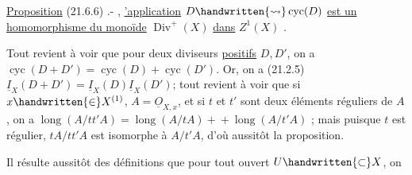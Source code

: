 \uline{Proposition} (21.6.6) .- , \uline{'application} $D\handwritten{\leadsto}\operatorname{cyc}(D)$\deleted{\unsure{;}} \uline{est un homomorphisme du monoïde} $\operatorname{Div}^{+}(X)$ \uline{dans} $Z^{1}(X)$ .

Tout revient à voir que pour deux diviseurs \uline{positifs} $D,D'$, on a $\operatorname{cyc}(D+D')=\operatorname{cyc}(D)+\operatorname{cyc}(D')$. Or, on a (21.2.5) $\underline I_{X}(D+D')=\underline I_{X}(D)\underline I_{X}(D')$; tout revient à voir que si $x\handwritten{\in}X^{(1)}$,  $A=\underline O_{X,x}$, et si $t$ et $t'$ sont deux éléments réguliers de $A$, on a $\operatorname{long}(A/tt'A)=\operatorname{long}(A/tA)+{}\allowbreak{}+\operatorname{long}(A/t'A)$ ; mais puisque  $t$ est régulier, $tA/tt'A$ est isomorphe à $A/t'A$, d'où  aussitôt la proposition.

Il résulte aussitôt des définitions que pour tout ouvert $U\handwritten{\subset}X$, on
